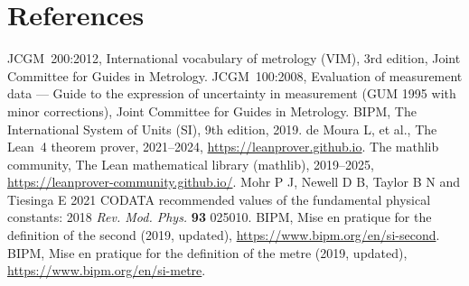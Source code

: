 \documentclass[11pt]{article}
\begin{document}
\section*{References}
\begin{thebibliography}{9}
 JCGM~200:2012, International vocabulary of metrology (VIM), 3rd edition, Joint Committee for Guides in Metrology.
 JCGM~100:2008, Evaluation of measurement data — Guide to the expression of uncertainty in measurement (GUM 1995 with minor corrections), Joint Committee for Guides in Metrology.
 BIPM, The International System of Units (SI), 9th edition, 2019.
 de Moura L, et al., The Lean~4 theorem prover, 2021--2024, \url{https://leanprover.github.io}.
 The mathlib community, The Lean mathematical library (mathlib), 2019--2025, \url{https://leanprover-community.github.io/}.
 Mohr P J, Newell D B, Taylor B N and Tiesinga E 2021 CODATA recommended values of the fundamental physical constants: 2018 \textit{Rev. Mod. Phys.} \textbf{93} 025010.
 BIPM, Mise en pratique for the definition of the second (2019, updated), \url{https://www.bipm.org/en/si-second}.
 BIPM, Mise en pratique for the definition of the metre (2019, updated), \url{https://www.bipm.org/en/si-metre}.
\end{thebibliography}
\end{document}
